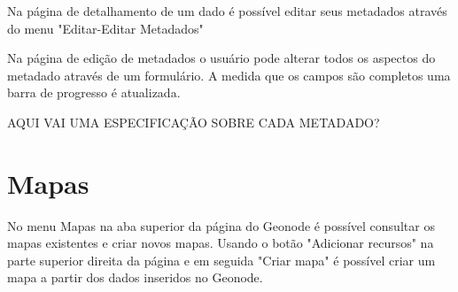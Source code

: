 \documentclass[12pt]{article}
\begin{document}
Na página de detalhamento de um dado é possível editar seus metadados
através do menu "Editar-Editar Metadados"

Na página de edição de metadados o usuário pode alterar todos os aspectos do
metadado através de um formulário. A medida que os campos são completos uma
barra de progresso é atualizada. 

AQUI VAI UMA ESPECIFICAÇÃO SOBRE CADA METADADO?

\section{Mapas}

No menu Mapas na aba superior da página do Geonode é possível consultar os
mapas existentes e criar novos mapas. Usando o botão "Adicionar recursos" na
parte superior direita da página e em seguida "Criar mapa" é possível criar um
mapa a partir dos dados inseridos no Geonode.




\end{document}
